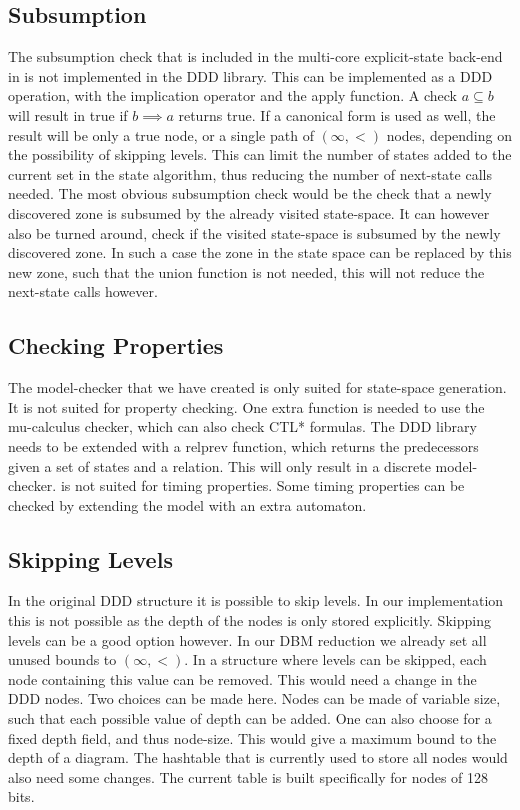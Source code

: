 \subsection{Subsumption}
The subsumption check that is included in the multi-core explicit-state back-end in \ltsmin{} is not implemented in the DDD library. This can be implemented as a DDD operation, with the implication operator and the apply function. A check $a \subseteq b$ will result in true if $b \implies a$ returns true. If a canonical form is used as well, the result will be only a true node, or a single path of $(\infty,<)$ nodes, depending on the possibility of skipping levels. This can limit the number of states added to the current set in the state algorithm, thus reducing the number of next-state calls needed. The most obvious subsumption check would be the check that a newly discovered zone is subsumed by the already visited state-space. It can however also be turned around, check if the visited state-space is subsumed by the newly discovered zone. In such a case the zone in the state space can be replaced by this new zone, such that the union function is not needed, this will not reduce the next-state calls however.

\subsection{Checking Properties}
The model-checker that we have created is only suited for state-space generation. It is not suited for property checking. One extra function is needed to use the \ltsmin{} mu-calculus checker, which can also check CTL* formulas. The DDD library needs to be extended with a relprev function, which returns the predecessors given a set of states and a relation. This will only result in a discrete model-checker. \ltsmin{} is not suited for timing properties. Some timing properties can be checked by extending the model with an extra automaton.

\subsection{Skipping Levels}
In the original DDD structure it is possible to skip levels. In our implementation this is not possible as the depth of the nodes is only stored explicitly. Skipping levels can be a good option however. In our DBM reduction we already set all unused bounds to $(\infty,<)$. In a structure where levels can be skipped, each node containing this value can be removed. This would need a change in the DDD nodes. Two choices can be made here. Nodes can be made of variable size, such that each possible value of depth can be added. One can also choose for a fixed depth field, and thus node-size. This would give a maximum bound to the depth of a diagram. The hashtable that is currently used to store all nodes would also need some changes. The current table is built specifically for nodes of 128 bits. 

